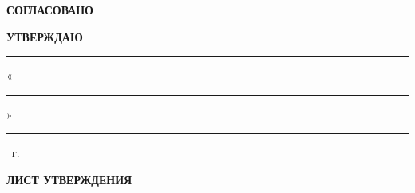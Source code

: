 \begin{center}
\begin{minipage}[t]{0.42\textwidth}
\textbf{СОГЛАСОВАНО}

\small
\scientificadvisorrole

\vspace{0.15cm}

\supervisorsignatureline{6cm}

\scientificadvisorname

\vspace{0.1cm}

\signdateblank
\ifhseHasCoSupervisor

\vspace{0.25cm}

\coscientificadvisorrole

\vspace{0.15cm}

\cosupervisorsignatureline{6cm}

\coscientificadvisorname

\vspace{0.1cm}

\signdateblank
\fi
\end{minipage}
\hspace{0.5cm}
\begin{minipage}[t]{0.42\textwidth}
\textbf{УТВЕРЖДАЮ}

\small
\academicsupervisorrole

\vspace{0.3cm}

\rule{6cm}{0.4pt}

\academicsupervisorname

\vspace{0.1cm}

«\rule{1cm}{0.4pt}» \rule{3cm}{0.4pt} \yearval~г.
\end{minipage}
\end{center}

\vspace{0.6cm}

\begin{center}
\textbf{\LARGE \projectname}

\vspace{0.3cm}

\textbf{\docname}

\vspace{0.1cm}

\textbf{ЛИСТ УТВЕРЖДЕНИЯ}

\vspace{0.1cm}

\textbf{\doccodelu}
\end{center}

